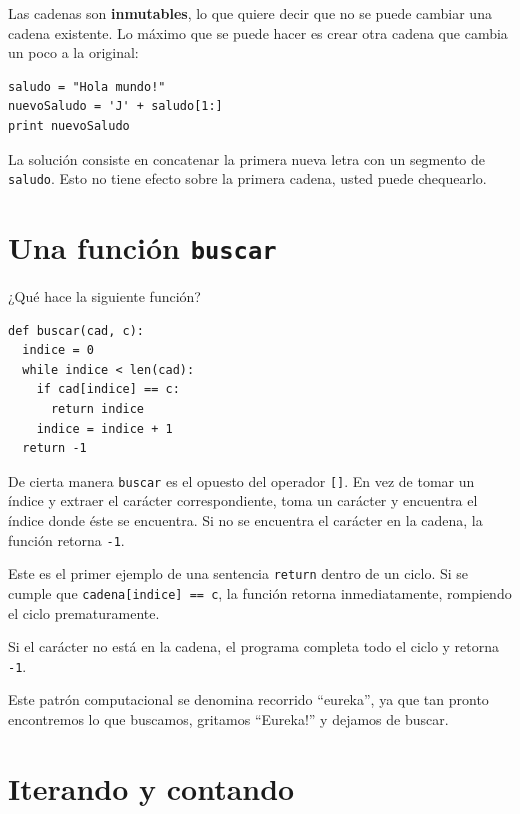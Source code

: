 
Las cadenas son \textbf{inmutables}, lo que quiere decir que no
se puede cambiar una cadena existente. Lo máximo que se puede
hacer es crear otra cadena que cambia un poco a la original:

\beforeverb
\begin{verbatim}
saludo = "Hola mundo!"
nuevoSaludo = 'J' + saludo[1:]
print nuevoSaludo
\end{verbatim}
\afterverb
%
La solución consiste en concatenar la primera nueva letra
con un segmento de  \texttt{saludo}. Esto no tiene efecto 
sobre la primera cadena, usted puede chequearlo.



\section{Una función  \texttt{buscar} }
\label{find}

¿Qué hace la siguiente función?

\beforeverb
\begin{verbatim}
def buscar(cad, c):
  indice = 0
  while indice < len(cad):
    if cad[indice] == c:
      return indice
    indice = indice + 1
  return -1
\end{verbatim}
\afterverb
%
De cierta manera \texttt{buscar} es el opuesto del operador \texttt{[]}.
En vez de tomar un índice y extraer el carácter correspondiente,
toma un carácter y encuentra el índice donde éste se encuentra.
Si no se encuentra el carácter en la cadena, la función  retorna \texttt{-1}.

Este es el primer ejemplo de una sentencia \texttt{return} dentro de 
un ciclo. Si se cumple que \texttt{cadena[indice] == c}, la función retorna 
inmediatamente, rompiendo el ciclo prematuramente.

Si el carácter no está en la cadena, el programa completa todo
el ciclo y retorna \texttt{-1}.

Este patrón computacional se denomina recorrido ``eureka'', ya que
tan pronto encontremos lo que buscamos, gritamos ``Eureka!'' y dejamos
de buscar.


\section{Iterando y contando}
\label{counter}

